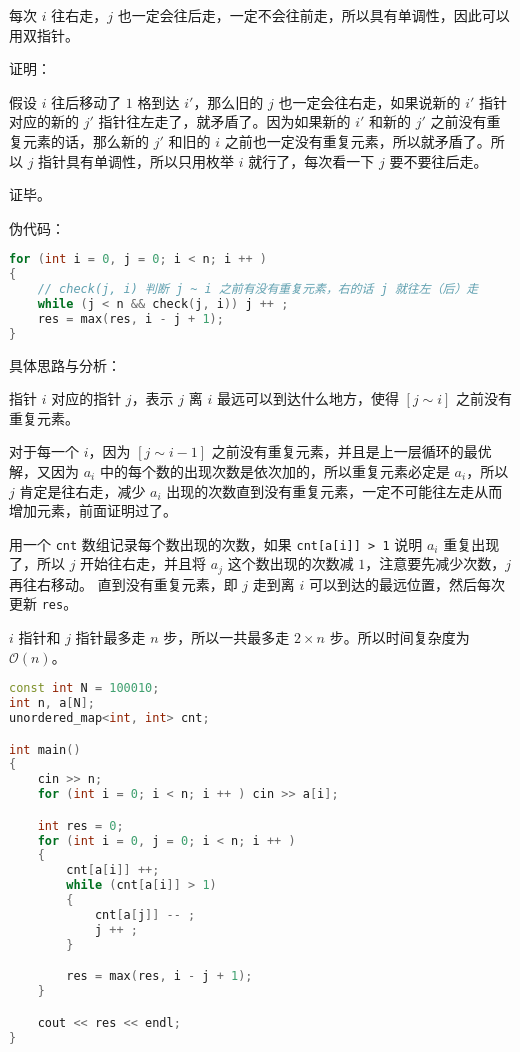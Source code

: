每次 $i$ 往右走，$j$ 也一定会往后走，一定不会往前走，所以具有单调性，因此可以用双指针。

证明：

假设 $i$ 往后移动了 $1$ 格到达 $i'$，那么旧的 $j$ 也一定会往右走，如果说新的 $i'$ 指针对应的新的 $j'$ 指针往左走了，就矛盾了。因为如果新的 $i'$ 和新的 $j'$ 之前没有重复元素的话，那么新的 $j'$ 和旧的 $i$ 之前也一定没有重复元素，所以就矛盾了。所以 $j$ 指针具有单调性，所以只用枚举 $i$ 就行了，每次看一下 $j$ 要不要往后走。

证毕。

伪代码：

\begin{lstlisting}[language=cpp]
for (int i = 0, j = 0; i < n; i ++ )
{
    // check(j, i) 判断 j ~ i 之前有没有重复元素，右的话 j 就往左（后）走
    while (j < n && check(j, i)) j ++ ;    
    res = max(res, i - j + 1);
}
\end{lstlisting}

具体思路与分析：

指针 $i$ 对应的指针 $j$，表示 $j$ 离 $i$ 最远可以到达什么地方，使得 $[j \sim i]$ 之前没有重复元素。

对于每一个 $i$，因为 $[j \sim i - 1]$ 之前没有重复元素，并且是上一层循环的最优解，又因为 $a_i$ 中的每个数的出现次数是依次加的，所以重复元素必定是 $a_i$，所以 $j$ 肯定是往右走，减少 $a_i$ 出现的次数直到没有重复元素，一定不可能往左走从而增加元素，前面证明过了。

用一个 \verb|cnt| 数组记录每个数出现的次数，如果 \verb|cnt[a[i]] > 1| 说明 $a_i$ 重复出现了，所以 $j$ 开始往右走，并且将 $a_j$ 这个数出现的次数减 $1$，注意要先减少次数，$j$ 再往右移动。 直到没有重复元素，即 $j$ 走到离 $i$ 可以到达的最远位置，然后每次更新 \verb|res|。

$i$ 指针和 $j$ 指针最多走 $n$ 步，所以一共最多走 $2 \times n$ 步。所以时间复杂度为 $\mathcal{O}(n)$。

\begin{lstlisting}[language=cpp]
const int N = 100010;
int n, a[N];
unordered_map<int, int> cnt;

int main() 
{
    cin >> n;
    for (int i = 0; i < n; i ++ ) cin >> a[i];

    int res = 0;
    for (int i = 0, j = 0; i < n; i ++ )
    {
        cnt[a[i]] ++;
        while (cnt[a[i]] > 1)
        {
            cnt[a[j]] -- ;
            j ++ ;
        }

        res = max(res, i - j + 1);
    }

    cout << res << endl;
}
\end{lstlisting}


